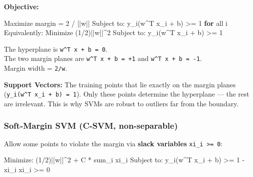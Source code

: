\documentclass[11pt]{article}
\newenvironment{Shaded}{\begin{snugshade}}{\end{snugshade}}
\newcommand{\BuiltInTok}[1]{\textcolor[rgb]{0.50,0.55,0.55}{#1}}
\newcommand{\ControlFlowTok}[1]{\textcolor[rgb]{0.99,0.74,0.29}{\textbf{#1}}}
\newcommand{\DecValTok}[1]{\textcolor[rgb]{0.96,0.45,0.00}{#1}}
\newcommand{\NormalTok}[1]{\textcolor[rgb]{0.81,0.81,0.76}{#1}}
\newcommand{\OperatorTok}[1]{\textcolor[rgb]{0.81,0.81,0.76}{#1}}
\begin{document}
\textbf{Objective:}


\begin{Shaded}
\begin{Highlighting}[]
\NormalTok{Maximize margin }\OperatorTok{=} \DecValTok{2} \OperatorTok{/} \OperatorTok{||}\NormalTok{w}\OperatorTok{||}
\NormalTok{Subject to: y\_i(w}\OperatorTok{\^{}}\NormalTok{T x\_i }\OperatorTok{+}\NormalTok{ b) }\OperatorTok{\textgreater{}=} \DecValTok{1}   \ControlFlowTok{for} \BuiltInTok{all}\NormalTok{ i}
\NormalTok{Equivalently: Minimize (}\DecValTok{1}\OperatorTok{/}\DecValTok{2}\NormalTok{)}\OperatorTok{||}\NormalTok{w}\OperatorTok{||\^{}}\DecValTok{2}
\NormalTok{              Subject to: y\_i(w}\OperatorTok{\^{}}\NormalTok{T x\_i }\OperatorTok{+}\NormalTok{ b) }\OperatorTok{\textgreater{}=} \DecValTok{1}
\end{Highlighting}
\end{Shaded}

The hyperplane is \texttt{w\^{}T\ x\ +\ b\ =\ 0}.\\
The two margin planes are \texttt{w\^{}T\ x\ +\ b\ =\ +1} and \texttt{w\^{}T\ x\ +\ b\ =\ -1}.\\
Margin width = \texttt{2/\textbar{}\textbar{}w\textbar{}\textbar{}}.

\textbf{Support Vectors:} The training points that lie exactly on the margin planes (\texttt{y\_i(w\^{}T\ x\_i\ +\ b)\ =\ 1}). Only these points determine the hyperplane --- the rest are irrelevant. This is why SVMs are robust to outliers far from the boundary.

\subsubsection{Soft-Margin SVM (C-SVM, non-separable)}\label{soft-margin-svm-c-svm-non-separable}

Allow some points to violate the margin via \textbf{slack variables} \texttt{xi\_i\ \textgreater{}=\ 0}:


\begin{Shaded}
\begin{Highlighting}[]
\NormalTok{Minimize: (}\DecValTok{1}\OperatorTok{/}\DecValTok{2}\NormalTok{)}\OperatorTok{||}\NormalTok{w}\OperatorTok{||\^{}}\DecValTok{2} \OperatorTok{+}\NormalTok{ C }\OperatorTok{*}\NormalTok{ sum\_i xi\_i}
\NormalTok{Subject to: y\_i(w}\OperatorTok{\^{}}\NormalTok{T x\_i }\OperatorTok{+}\NormalTok{ b) }\OperatorTok{\textgreater{}=} \DecValTok{1} \OperatorTok{{-}}\NormalTok{ xi\_i}
\NormalTok{            xi\_i }\OperatorTok{\textgreater{}=} \DecValTok{0}
\end{Highlighting}
\end{Shaded}
\end{document}
